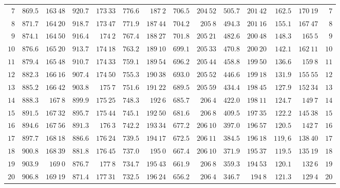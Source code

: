 \begin{GaussVICeresFrame}{.92}
{\begin{tabular}{r@{\GaussVICeresRule}r|r@{\GaussVICeresRule}r|r@{\GaussVICeresRule}r|r@{\GaussVICeresRule}r|r@{\GaussVICeresRule}r|r@{\GaussVICeresRule}r|r@{\GaussVICeresRule}r}
$7$ & $869.5$ & $163\ 48$ & $920.7$ & $173\ 33$ & $776.6$ & $187\ 2$ & $706.5$ & $204\ 52$ & $505.7$ & $201\ 42$ & $162.5$ & $170\ 19$ & $7$ \\
$8$ & $871.7$ & $164\ 20$ & $918.7$ & $173\ 47$ & $771.9$ & $187\ 44$ & $704.2$ & $205\ 8$ & $494.3$ & $201\ 16$ & $155.1$ & $167\ 47$ & $8$ \\
$9$ & $874.1$ & $164\ 50$ & $916.4$ & $174\ 2$ & $767.4$ & $188\ 27$ & $701.8$ & $205\ 21$ & $482.6$ & $200\ 48$ & $148.3$ & $165\ 5$ & $9$ \\
$10$ & $876.6$ & $165\ 20$ & $913.7$ & $174\ 18$ & $763.2$ & $189\ 10$ & $699.1$ & $205\ 33$ & $470.8$ & $200\ 20$ & $142.1$ & $162\ 11$ & $10$ \\[3pt]
$11$ & $879.4$ & $165\ 48$ & $910.7$ & $174\ 33$ & $759.1$ & $189\ 54$ & $696.2$ & $205\ 44$ & $458.8$ & $199\ 50$ & $136.6$ & $159\ 8$ & $11$ \\
$12$ & $882.3$ & $166\ 16$ & $907.4$ & $174\ 50$ & $755.3$ & $190\ 38$ & $693.0$ & $205\ 52$ & $446.6$ & $199\ 18$ & $131.9$ & $155\ 55$ & $12$ \\
$13$ & $885.2$ & $166\ 42$ & $903.8$ & $175\ 7$ & $751.6$ & $191\ 22$ & $689.5$ & $205\ 59$ & $434.4$ & $198\ 45$ & $127.9$ & $152\ 34$ & $13$ \\
$14$ & $888.3$ & $167\ 8$ & $899.9$ & $175\ 25$ & $748.3$ & $192\ 6$ & $685.7$ & $206\ 4$ & $422.0$ & $198\ 11$ & $124.7$ & $149\ 7$ & $14$ \\
$15$ & $891.5$ & $167\ 32$ & $895.7$ & $175\ 44$ & $745.1$ & $192\ 50$ & $681.6$ & $206\ 8$ & $409.5$ & $197\ 35$ & $122.2$ & $145\ 38$ & $15$ \\[3pt]
$16$ & $894.6$ & $167\ 56$ & $891.3$ & $176\ 3$ & $742.2$ & $193\ 34$ & $677.2$ & $206\ 10$ & $397.0$ & $196\ 57$ & $120.5$ & $142\ 7$ & $16$ \\
$17$ & $897.7$ & $168\ 18$ & $886.6$ & $176\ 24$ & $739.5$ & $194\ 17$ & $672.5$ & $206\ 11$ & $384.5$ & $196\ 18$ & $119{,}6$ & $138\ 40$ & $17$ \\
$18$ & $900.8$ & $168\ 39$ & $881.8$ & $176\ 45$ & $737.0$ & $195\ 0$ & $667.4$ & $206\ 10$ & $371.9$ & $195\ 37$ & $119.5$ & $135\ 19$ & $18$ \\
$19$ & $903.9$ & $169\ 0$ & $876.7$ & $177\ 8$ & $734.7$ & $195\ 43$ & $661.9$ & $206\ 8$ & $359.3$ & $194\ 53$ & $120.1$ & $132\ 6$ & $19$ \\
$20$ & $906.8$ & $169\ 19$ & $871.4$ & $177\ 31$ & $732.5$ & $196\ 24$ & $656.2$ & $206\ 4$ & $346.7$ & $194\ 8$ & $121.3$ & $129\ 4$ & $20$ \\[3pt]

\end{tabular}}
\end{GaussVICeresFrame}
